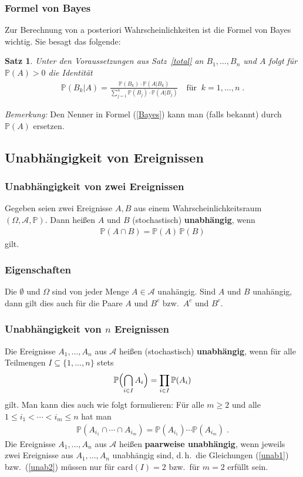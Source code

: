 \documentclass[ngerman,draft,parskip=half,twoside]{scrartcl}
\newtheorem{thm}{Satz}[section]
\newcommand*{\Algeb}{\mathcal{A}}   %
\newcommand*{\WKM}{\mathbb{P}}      %
\begin{document}
\subsubsection{Formel von Bayes}
Zur Berechnung von a posteriori Wahrscheinlichkeiten ist die Formel von
Bayes wichtig. Sie besagt das folgende:
\begin{thm}
Unter den Voraussetzungen aus Satz~\ref{total} an $B_1,\ldots,B_n$ und $A$ folgt
für
$\WKM(A)>0$ die Identität
\begin{gather}
\label{Bayes}
\WKM(B_k|A)=\frac{\WKM(B_k)\cdot\WKM(A|B_k)}{\sum_{j=1}^n
\WKM(B_j)\cdot\WKM(A|B_j)}\quad\mbox{für}\;\;k=1,\ldots,n\;.
\end{gather}
\end{thm}
\textit{Bemerkung:} Den Nenner in Formel (\ref{Bayes}) kann man (falls bekannt) durch $\WKM(A)$
ersetzen.
\subsection{Unabhängigkeit von Ereignissen}
\subsubsection{Unabhängigkeit von zwei Ereignissen}
Gegeben seien zwei Ereignisse $A,B$ aus einem Wahrscheinlichkeitsraum $(\Omega,\Algeb,\WKM)$.
Dann heißen $A$ und $B$ (stochastisch) \textbf{unabhängig}, wenn
\begin{gather*}
  \WKM(A\cap B)=\WKM(A)\,\WKM(B)
\end{gather*}
gilt.
\subsubsection{Eigenschaften}
Die $\emptyset$ und $\Omega$ sind von jeder Menge $A\in\Algeb$ unahängig. Sind
$A$ und $B$ unahängig, dann gilt dies auch für die Paare $A$ und $B^c$ bzw.~$A^c$ und $B^c$.
\subsubsection{Unabhängigkeit von $n$ Ereignissen}
Die Ereignisse $A_1,\ldots,A_n$ aus $\Algeb$ heißen (stochastisch) \textbf{unabhängig},
wenn für alle Teilmengen $I\subseteq\{1,\ldots,n\}$ stets
\begin{gather}
\label{unab1}
\WKM\Bigl(\bigcap_{i\in I} A_i\Bigr)= \prod_{i\in I}\WKM(A_i)
\end{gather}
gilt. Man kann dies auch wie folgt formulieren: Für alle $m\ge 2$ und alle
$1\le i_1<\cdots<i_m\le n$ hat man
\begin{gather}
\label{unab2}
\WKM(A_{i_1}\cap\cdots\cap A_{i_m})= \WKM(A_{i_1})\cdots\WKM(A_{i_m})\;.
\end{gather}
Die Ereignisse $A_1,\ldots,A_n$ aus $\Algeb$ heißen \textbf{paarweise unabhängig}, wenn
jeweils zwei Ereignisse aus $A_1,\ldots,A_n$ unabhängig sind, d.\,h.~die Gleichungen
(\ref{unab1}) bzw.~(\ref{unab2}) müssen nur für $\mathrm{card}(I)=2$ bzw.~für $m=2$ erfüllt sein.
\end{document}
